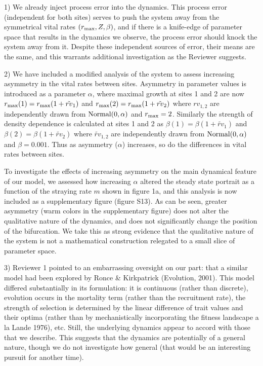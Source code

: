 \documentclass[ucm,12pt]{ucletter}
\begin{document}
\begin{letter}
1) We already inject process error into the dynamics. This process error (independent for both sites) serves to push the system away from the symmetrical vital rates $(r_{\rm max}, Z, \beta)$, and if there is a knife-edge of parameter space that results in the dynamics we observe, the process error should knock the system away from it. Despite these independent sources of error, their means are the same, and this warrants additional investigation as the Reviewer suggests.

2) We have included a modified analysis of the system to assess increasing asymmetry in the vital rates between sites. Asymmetry in parameter values is introduced as a parameter $\alpha$, where maximal growth at sites 1 and 2 are now  $r_{\rm max}(1)=r_{\rm max}(1+\tilde{rv}_1)$ and $r_{\rm max}(2)=r_{\rm max}(1+\tilde{rv}_2)$ where $rv_{1,2}$ are independently drawn from $\rm{Normal}(0,\alpha)$ and $r_{\rm max}=2$. 
Similarly the strength of density dependence is calculated at sites 1 and 2 as $\beta(1)=\beta(1+\tilde{rv}_1)$ and $\beta(2)=\beta(1+\tilde{rv}_2)$ where $\tilde{rv}_{1,2}$ are independently drawn from $\rm{Normal}(0,\alpha)$ and $\beta=0.001$.
Thus as asymmetry ($\alpha$) increases, so do the differences in vital rates between sites.

To investigate the effects of increasing asymmetry on the main dynamical feature of our model, we assessed how increasing $\alpha$ altered the steady state portrait as a function of the straying rate $m$ shown in figure 1a, and this analysis is now included as a supplementary figure (figure S13). As can be seen, greater asymmetry (warm colors in the supplementary figure) does not alter the qualitative nature of the dynamics, and does not significantly change the position of the bifurcation. We take this as strong evidence that the qualitative nature of the system is not a mathematical construction relegated to a small slice of parameter space.

3) Reviewer 1 pointed to an embarrassing oversight on our part: that a similar model had been explored by Ronce \& Kirkpatrick (Evolution, 2001). This model differed substantially in its formulation: it is continuous (rather than discrete), evolution occurs in the mortality term (rather than the recruitment rate), the strength of selection is determined by the linear difference of trait values and their optima (rather than by mechanistically incorporating the fitness landscape a la Lande 1976), etc. Still, the underlying dynamics appear to accord with those that we describe. This suggests that the dynamics are potentially of a general nature, though we do not investigate how general (that would be an interesting pursuit for another time).


\end{letter}
\end{document}
